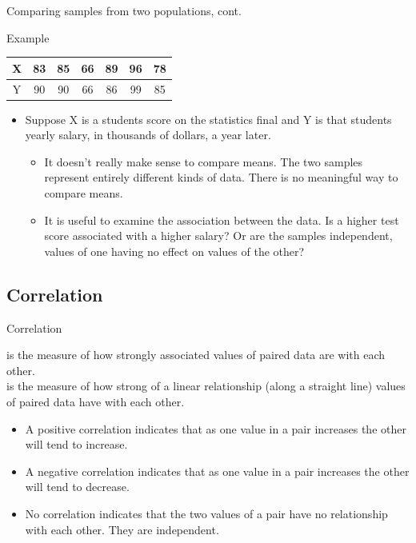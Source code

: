 \documentclass[xcolor=table]{beamer}
\begin{document}
\begin{frame}{Comparing samples from two populations, cont.}
\begin{exampleblock}{Example}
\large
\smallskip
{\centering
\begin{tabular}{c | c c c c c c}
X & 83 & 85 & 66 & 89 & 96 & 78\\
\hline
Y & 90 & 90 & 66 & 86 & 99 & 85
\end{tabular}
\par}
\medskip
\begin{itemize}
\item Suppose X is a students score on the statistics final and Y is that students yearly salary, in thousands of dollars, a year later.
\begin{itemize}
\pause\item It doesn't really make sense to compare means. The two samples represent entirely different kinds of data. There is no meaningful way to compare means.
\pause\item It is useful to examine the association between the data. Is a higher test score associated with a higher salary? Or are the samples independent, values of one having no effect on values of the other?
\end{itemize}
\end{itemize}

\end{exampleblock}
\end{frame}

\subsection{Correlation}

\begin{frame}{Correlation}
\begin{block}{}
\large
{} is the measure of how strongly associated values of paired data are with each other.\\
\pause\medskip
{} is the measure of how strong of a linear relationship (along a straight line)  values of paired data have with each other. 
\begin{itemize}
\pause\item A positive correlation indicates that as one value in a pair increases the other will tend to increase.
\pause\item A negative correlation indicates that as one value in a pair increases the other will tend to decrease.
\pause\item No correlation indicates that the two values of a pair have no relationship with each other. They are independent.
\end{itemize}
\end{block}
\end{frame}
\end{document}
